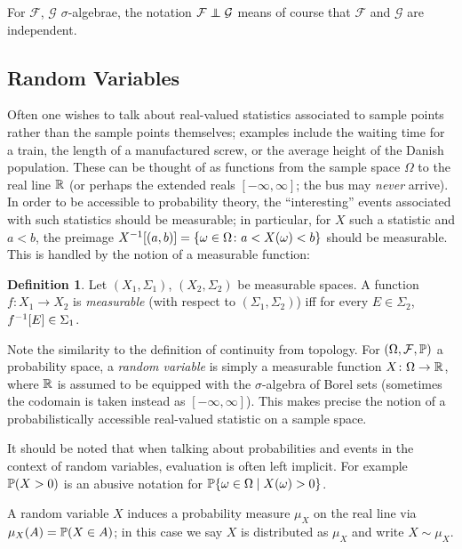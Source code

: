 \documentclass[leqno]{article}
\theoremstyle{definition}
\newtheorem{definition}[theorem]{Definition}
\newcommand{\bldset}[2]{\{{#1}\mid{#2}\}}
\newcommand\indep{\protect\mathpalette{\protect\independenT}{\perp}}
\def\independenT#1#2{\mathrel{\rlap{$#1#2$}\mkern2mu{#1#2}}}
\begin{document}
For $\mathcal F$, $\mathcal G$ $\sigma$-algebrae, the notation $\mathcal F \indep \mathcal G$ means of course that $\mathcal F$ and $\mathcal G$ are independent.

\subsection{Random Variables}

Often one wishes to talk about real-valued statistics associated to sample points rather than the sample points themselves; examples include the waiting time for a train, the length of a manufactured screw, or the average height of the Danish population. These can be thought of as functions from the sample space $\Omega$ to the real line $\R$ (or perhaps the extended reals $[-\infty, \infty]$; the bus may {\em never} arrive). In order to be accessible to probability theory, the ``interesting'' events associated with such statistics should be measurable; in particular, for $X$ such a statistic and $a < b$, the preimage $X\inv[(a,b)] = \{\omega \in \Omega\colon a < X(\omega) < b\}$ should be measurable. This is handled by the notion of a measurable function:

\begin{definition}
Let $(X_1, \Sigma_1)$, $(X_2, \Sigma_2)$ be measurable spaces. A function $f\colon X_1 \rightarrow X_2$ is {\em measurable} (with respect to $(\Sigma_1, \Sigma_2)$) iff for every $E \in \Sigma_2$, $f\inv[E] \in \Sigma_1$.
\end{definition}

Note the similarity to the definition of continuity from topology. For $(\Omega, \mathcal F, \P)$ a probability space, a {\em random variable} is simply a measurable function $X\colon \Omega \rightarrow \R$, where $\R$ is assumed to be equipped with the $\sigma$-algebra of Borel sets (sometimes the codomain is taken instead as $[-\infty, \infty]$). This makes precise the notion of a probabilistically accessible real-valued statistic on a sample space.

It should be noted that when talking about probabilities and events in the context of random variables, evaluation is often left implicit. For example $\P(X > 0)$ is an abusive notation for $\P\bldset{\omega \in \Omega}{X(\omega) > 0}$.

A random variable $X$ induces a probability measure $\mu_X$ on the real line via $\mu_X (A) = \P(X \in A)$; in this case we say $X$ is distributed as $\mu_X$ and write $X \sim \mu_X$.
\end{document}
